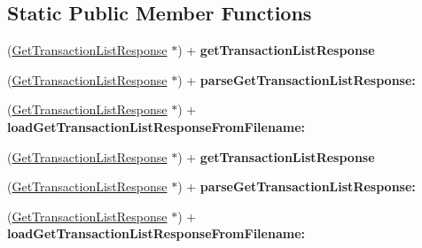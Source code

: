 \subsection*{Static Public Member Functions}
\begin{DoxyCompactItemize}
\item 
\hypertarget{interface_get_transaction_list_response_a746135f7657b663e18a062e1c504e981}{
(\hyperlink{interface_get_transaction_list_response}{GetTransactionListResponse} $\ast$) + {\bfseries getTransactionListResponse}}
\label{interface_get_transaction_list_response_a746135f7657b663e18a062e1c504e981}

\item 
\hypertarget{interface_get_transaction_list_response_a295e774b70786bead32eeaaf8d3f6a22}{
(\hyperlink{interface_get_transaction_list_response}{GetTransactionListResponse} $\ast$) + {\bfseries parseGetTransactionListResponse:}}
\label{interface_get_transaction_list_response_a295e774b70786bead32eeaaf8d3f6a22}

\item 
\hypertarget{interface_get_transaction_list_response_ab915f5978c9e03602ebdc52e3de9e97d}{
(\hyperlink{interface_get_transaction_list_response}{GetTransactionListResponse} $\ast$) + {\bfseries loadGetTransactionListResponseFromFilename:}}
\label{interface_get_transaction_list_response_ab915f5978c9e03602ebdc52e3de9e97d}

\item 
\hypertarget{interface_get_transaction_list_response_a746135f7657b663e18a062e1c504e981}{
(\hyperlink{interface_get_transaction_list_response}{GetTransactionListResponse} $\ast$) + {\bfseries getTransactionListResponse}}
\label{interface_get_transaction_list_response_a746135f7657b663e18a062e1c504e981}

\item 
\hypertarget{interface_get_transaction_list_response_a295e774b70786bead32eeaaf8d3f6a22}{
(\hyperlink{interface_get_transaction_list_response}{GetTransactionListResponse} $\ast$) + {\bfseries parseGetTransactionListResponse:}}
\label{interface_get_transaction_list_response_a295e774b70786bead32eeaaf8d3f6a22}

\item 
\hypertarget{interface_get_transaction_list_response_ab915f5978c9e03602ebdc52e3de9e97d}{
(\hyperlink{interface_get_transaction_list_response}{GetTransactionListResponse} $\ast$) + {\bfseries loadGetTransactionListResponseFromFilename:}}
\label{interface_get_transaction_list_response_ab915f5978c9e03602ebdc52e3de9e97d}


\end{DoxyCompactItemize}
